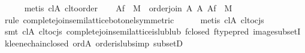 \begin{isabellebody}
\ \ \ \ \isamarkupfalse%
\ {}metis\ cl{}A\ cl{}to{}order{}\isanewline
\isanewline
\ \ \isamarkupfalse%
\ {}{}\isactrlbsub Af\ {}\ {}M{}\ {}\ order{}join\ A\ {}\isactrlbsub A\isactrlesub \ {}{}\isactrlbsub Af\ {}\ {}M{}{}{}\isanewline
\ \ \ \ \isamarkupfalse%
\ {}rule\ complete{}join{}semilattice{}bot{}onel{}symmetric{}{}\isanewline
\ \ \ \ \isamarkupfalse%
\ {}metis\ cl{}A\ cl{}to{}cjs{}\isanewline
\ \ \ \ \isamarkupfalse%
\ {}smt\ cl{}A\ cl{}to{}cjs\ complete{}join{}semilattice{}is{}lub{}lub\ f{}closed\ ftype{}pred\ image{}subsetI\ kleene{}chain{}closed\ ord{}A\ order{}is{}lub{}simp\ subsetD{}\isanewline

\end{isabellebody}
